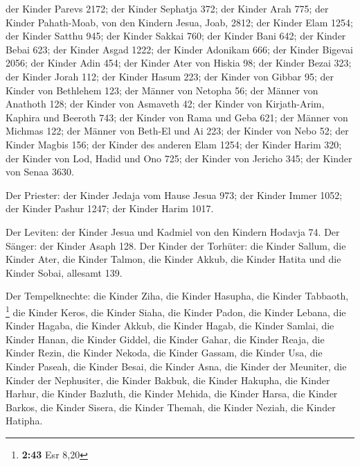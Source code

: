  der Kinder Parevs 2172;  der Kinder
Sephatja 372;  der Kinder Arah 775;  der
Kinder Pahath-Moab, von den Kindern Jesua, Joab, 2812; 
der Kinder Elam 1254;  der Kinder Satthu 945;
 der Kinder Sakkai 760;  der Kinder Bani
642;  der Kinder Bebai 623;  der Kinder
Asgad 1222;  der Kinder Adonikam 666;  der
Kinder Bigevai 2056;  der Kinder Adin 454;
 der Kinder Ater von Hiskia 98;  der
Kinder Bezai 323;  der Kinder Jorah 112; 
der Kinder Hasum 223;  der Kinder von Gibbar 95;
 der Kinder von Bethlehem 123;  der Männer
von Netopha 56;  der Männer von Anathoth 128;
 der Kinder von Asmaveth 42;  der Kinder
von Kirjath-Arim, Kaphira und Beeroth 743;  der Kinder
von Rama und Geba 621;  der Männer von Michmas 122;
 der Männer von Beth-El und Ai 223;  der
Kinder von Nebo 52;  der Kinder Magbis 156;
 der Kinder des anderen Elam 1254;  der
Kinder Harim 320;  der Kinder von Lod, Hadid und Ono 725;
 der Kinder von Jericho 345;  der Kinder
von Senaa 3630.

 Der Priester: der Kinder Jedaja vom Hause Jesua 973;
 der Kinder Immer 1052;  der Kinder Pashur
1247;  der Kinder Harim 1017.

 Der Leviten: der Kinder Jesua und Kadmiel von den
Kindern Hodavja 74.  Der Sänger: der Kinder Asaph 128.
 Der Kinder der Torhüter: die Kinder Sallum, die Kinder
Ater, die Kinder Talmon, die Kinder Akkub, die Kinder Hatita und die
Kinder Sobai, allesamt 139.

 Der Tempelknechte: die Kinder Ziha, die Kinder Hasupha,
die Kinder Tabbaoth, \footnote{\textbf{2:43} Esr 8,20} 
die Kinder Keros, die Kinder Siaha, die Kinder Padon, 
die Kinder Lebana, die Kinder Hagaba, die Kinder Akkub, 
die Kinder Hagab, die Kinder Samlai, die Kinder Hanan, 
die Kinder Giddel, die Kinder Gahar, die Kinder Reaja, 
die Kinder Rezin, die Kinder Nekoda, die Kinder Gassam, 
die Kinder Usa, die Kinder Paseah, die Kinder Besai,  die
Kinder Asna, die Kinder der Meuniter, die Kinder der Nephusiter,
 die Kinder Bakbuk, die Kinder Hakupha, die Kinder
Harhur,  die Kinder Bazluth, die Kinder Mehida, die
Kinder Harsa,  die Kinder Barkos, die Kinder Sisera, die
Kinder Themah,  die Kinder Neziah, die Kinder Hatipha.

